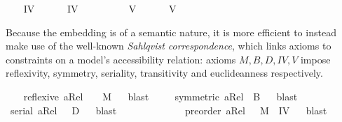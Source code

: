\begin{isabellebody}
\ \ \isamarkupfalse%
\ IV\ \isanewline
\ \ \ \ \ {\isachardoublequoteopen}IV\ {\isasymequiv}\ \isactrlbold {\isasymforall}{\isasymphi}{\isachardot}\ \isactrlbold {\isasymbox}{\isasymphi}\ \isactrlbold {\isasymrightarrow}\ \ \isactrlbold {\isasymbox}\isactrlbold {\isasymbox}{\isasymphi}{\isachardoublequoteclose}\isanewline
\ \ \isamarkupfalse%
\ V\ \isanewline
\ \ \ \ \ {\isachardoublequoteopen}V\ {\isasymequiv}\ \isactrlbold {\isasymforall}{\isasymphi}{\isachardot}\ \isactrlbold {\isasymdiamond}{\isasymphi}\ \isactrlbold {\isasymrightarrow}\ \isactrlbold {\isasymbox}\isactrlbold {\isasymdiamond}{\isasymphi}{\isachardoublequoteclose}%
\begin{isamarkuptext}%
Because the embedding is of a semantic nature, it is more efficient to instead make use of 
  the well-known \emph{Sahlqvist correspondence}, which links axioms to constraints on a model's accessibility
  relation: axioms $M, B, D, IV, V$ impose reflexivity, symmetry, seriality, transitivity and euclideanness respectively.%
\end{isamarkuptext}\isamarkuptrue%
\ \ \isamarkupfalse%
\ {\isachardoublequoteopen}reflexive\ aRel\ \ {\isasymLongrightarrow}\ \ {\isasymlfloor}M{\isasymrfloor}{\isachardoublequoteclose}%
\isadelimproof
\ %
\endisadelimproof
%
\isatagproof
{}\isamarkupfalse%
\ blast\ %
%
\endisatagproof
{\isafoldproof}%
%
\isadelimproof
%
\endisadelimproof
\isanewline
\ \ \isamarkupfalse%
\ {\isachardoublequoteopen}symmetric\ aRel\ {\isasymLongrightarrow}\ {\isasymlfloor}B{\isasymrfloor}{\isachardoublequoteclose}%
\isadelimproof
\ %
\endisadelimproof
%
\isatagproof
{}\isamarkupfalse%
\ blast%
\endisatagproof
{\isafoldproof}%
%
\isadelimproof
%
\endisadelimproof
\isanewline
\ \ \isamarkupfalse%
\ {\isachardoublequoteopen}serial\ aRel\ \ {\isasymLongrightarrow}\ {\isasymlfloor}D{\isasymrfloor}{\isachardoublequoteclose}%
\isadelimproof
\ %
\endisadelimproof
%
\isatagproof
{}\isamarkupfalse%
\ blast%
\endisatagproof
{\isafoldproof}%
%
\isadelimproof
%
\endisadelimproof
\ \ \ \ \ \ \ \ \ \isanewline
\ \ \isamarkupfalse%
\ {\isachardoublequoteopen}preorder\ aRel\ {\isasymLongrightarrow}\ \ {\isasymlfloor}M{\isasymrfloor}\ {\isasymand}\ {\isasymlfloor}IV{\isasymrfloor}{\isachardoublequoteclose}%
\isadelimproof
\ %
\endisadelimproof
%
\isatagproof
{}\isamarkupfalse%
\ blast\ %
\end{isabellebody}
